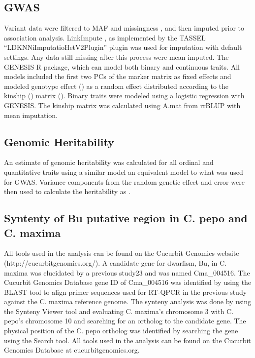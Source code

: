 \documentclass[utf8]{FrontiersinHarvard} %
\begin{document}
\subsection{GWAS}
Variant data were filtered to MAF  and missingness , and then imputed prior to association analysis. LinkImpute \citep{Money2015}, as implemented by the TASSEL \citep{Bradbury2007} “LDKNNiImputatioHetV2Plugin” plugin was used for imputation with default settings. Any data still missing after this process were mean imputed. The GENESIS \citep{} R package, which can model both binary and continuous traits. All models included the first two PCs of the marker matrix as fixed effects and modeled genotype effect () as a random effect distributed according to the kinship () matrix (). Binary traits were modeled using a logistic regression with GENESIS. The kinship matrix was calculated using A.mat from rrBLUP \citep{Endelman2011} with mean imputation.

\subsection{Genomic Heritability}

An estimate of genomic heritability \citep{Campos2015} was calculated for all ordinal and quantitative traits using a similar model an equivalent model to what was used for GWAS. Variance components from the random genetic effect and error were then used to calculate the heritability as .

\subsection{Syntenty of Bu putative region in C. pepo and C. maxima}
All tools used in the analysis can be found on the Cucurbit Genomics website (http://cucurbitgenomics.org/). A candidate gene for dwarfism, Bu, in C. maxima was elucidated by a previous study23 and was named Cma\_004516. The Cucurbit Genomics Database gene ID of Cma\_004516 was identified by using the BLAST tool to align primer sequences used for RT-QPCR in the previous study against the C. maxima reference genome. The synteny analysis was done by using the Synteny Viewer tool and evaluating C. maxima’s chromosome 3 with C. pepo’s chromosome 10 and searching for an ortholog to the candidate gene. The physical position of the C. pepo ortholog was identified by searching the gene using the Search tool. All tools used in the analysis can be found on the Cucurbit Genomics Database at cucurbitgenomics.org.
\end{document}
